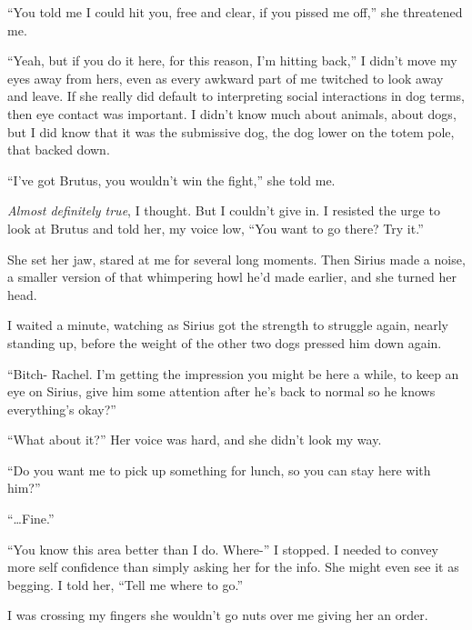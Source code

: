 ``You told me I could hit you, free and clear, if you pissed me off,'' she threatened me.



``Yeah, but if you do it here, for this reason, I'm hitting back,'' I didn't move my eyes away from hers, even as every awkward part of me twitched to look away and leave.  If she really did default to interpreting social interactions in dog terms, then eye contact was important.  I didn't know much about animals, about dogs, but I did know that it was the submissive dog, the dog lower on the totem pole, that backed down.



``I've got Brutus, you wouldn't win the fight,'' she told me.



\emph{Almost definitely true}, I thought.  But I couldn't give in.  I resisted the urge to look at Brutus and told her, my voice low, ``You want to go there?  Try it.''



She set her jaw, stared at me for several long moments.  Then Sirius made a noise, a smaller version of that whimpering howl he'd made earlier, and she turned her head.



I waited a minute, watching as Sirius got the strength to struggle again, nearly standing up, before the weight of the other two dogs pressed him down again.



``Bitch- Rachel.  I'm getting the impression you might be here a while, to keep an eye on Sirius, give him some attention after he's back to normal so he knows everything's okay?''



``What about it?''  Her voice was hard, and she didn't look my way.



``Do you want me to pick up something for lunch, so you can stay here with him?''



``\ldots{}Fine.''



``You know this area better than I do.  Where-'' I stopped.  I needed to convey more self confidence than simply asking her for the info.  She might even see it as begging.  I told her, ``Tell me where to go.''



I was crossing my fingers she wouldn't go nuts over me giving her an order.



